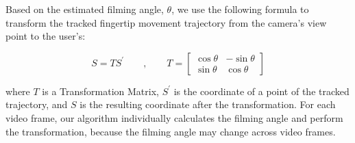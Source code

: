 Based on the estimated filming angle, $\theta$, we use the following formula to transform the tracked fingertip movement trajectory from the camera's view point to the user's:

\begin{equation}
        S=TS^{'} \qquad, \qquad  T=\left[ \begin{matrix} \cos\theta & -\sin\theta \\ \sin\theta & \cos\theta \end{matrix} \right]
\end{equation}

where $T$ is a Transformation Matrix, $S^{'}$ is the coordinate of a point of the tracked trajectory, and $S$ is the resulting coordinate after the transformation.
For each video frame, our algorithm individually calculates the filming angle and perform the transformation, because the filming angle may change across video frames.



